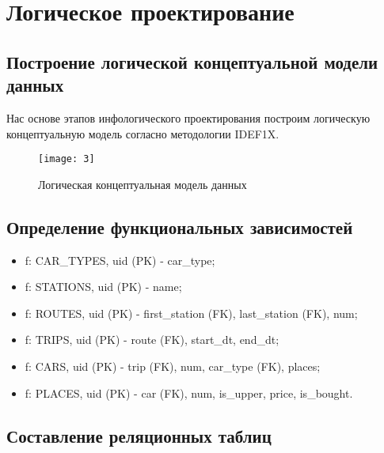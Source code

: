 \section{Логическое проектирование}

\subsection{Построение логической концептуальной модели данных}

Нас основе этапов инфологического проектирования построим логическую концептуальную модель согласно методологии IDEF1X.\par 

\begin{figure}[h!]
    \centering
    \texttt{[image: 3]}
    \caption{Логическая концептуальная модель данных}
    \label{img:3}
\end{figure}

\vspace{0.8cm}

\clearpage

\subsection{Определение функциональных зависимостей}

\begin{itemize}
\item f: CAR\_TYPES, uid (PK) - car\_type;
\item f: STATIONS, uid (PK) - name;
\item f: ROUTES, uid (PK) - first\_station (FK), last\_station (FK), num;
\item f: TRIPS, uid (PK) - route (FK), start\_dt, end\_dt;
\item f: CARS, uid (PK) - trip (FK), num, car\_type (FK), places;
\item f: PLACES, uid (PK) - car (FK), num, is\_upper, price, is\_bought.
\end{itemize}

\vspace{0.8cm}

\subsection{Составление реляционных таблиц}

